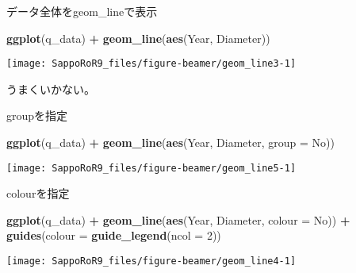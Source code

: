 \documentclass[ignorenonframetext,]{beamer}
\newenvironment{Shaded}{\begin{snugshade}}{\end{snugshade}}
\newcommand{\KeywordTok}[1]{\textcolor[rgb]{0.13,0.29,0.53}{\textbf{#1}}}
\newcommand{\DataTypeTok}[1]{\textcolor[rgb]{0.13,0.29,0.53}{#1}}
\newcommand{\DecValTok}[1]{\textcolor[rgb]{0.00,0.00,0.81}{#1}}
\newcommand{\StringTok}[1]{\textcolor[rgb]{0.31,0.60,0.02}{#1}}
\newcommand{\OperatorTok}[1]{\textcolor[rgb]{0.81,0.36,0.00}{\textbf{#1}}}
\newcommand{\NormalTok}[1]{#1}
\let\oldShaded\Shaded
\let\endoldShaded\endShaded
\renewenvironment{Shaded}{\footnotesize\oldShaded}{\endoldShaded}
\begin{document}
\begin{frame}[fragile]{データ全体をgeom\_lineで表示}

\begin{Shaded}
\begin{Highlighting}[]
\KeywordTok{ggplot}\NormalTok{(q_data) }\OperatorTok{+}\StringTok{ }\KeywordTok{geom_line}\NormalTok{(}\KeywordTok{aes}\NormalTok{(Year, Diameter))}
\end{Highlighting}
\end{Shaded}

\texttt{[image: SappoRoR9\_files/figure-beamer/geom\_line3-1]}

うまくいかない。

\end{frame}

\begin{frame}[fragile]{groupを指定}

\begin{Shaded}
\begin{Highlighting}[]
\KeywordTok{ggplot}\NormalTok{(q_data) }\OperatorTok{+}\StringTok{ }\KeywordTok{geom_line}\NormalTok{(}\KeywordTok{aes}\NormalTok{(Year, Diameter, }\DataTypeTok{group =}\NormalTok{ No))}
\end{Highlighting}
\end{Shaded}

\texttt{[image: SappoRoR9\_files/figure-beamer/geom\_line5-1]}

\end{frame}

\begin{frame}[fragile]{colourを指定}

\begin{Shaded}
\begin{Highlighting}[]
\KeywordTok{ggplot}\NormalTok{(q_data) }\OperatorTok{+}\StringTok{ }\KeywordTok{geom_line}\NormalTok{(}\KeywordTok{aes}\NormalTok{(Year, Diameter, }\DataTypeTok{colour =}\NormalTok{ No)) }\OperatorTok{+}
\StringTok{   }\KeywordTok{guides}\NormalTok{(}\DataTypeTok{colour =} \KeywordTok{guide_legend}\NormalTok{(}\DataTypeTok{ncol =} \DecValTok{2}\NormalTok{))}
\end{Highlighting}
\end{Shaded}

\texttt{[image: SappoRoR9\_files/figure-beamer/geom\_line4-1]}

\end{frame}
\end{document}
